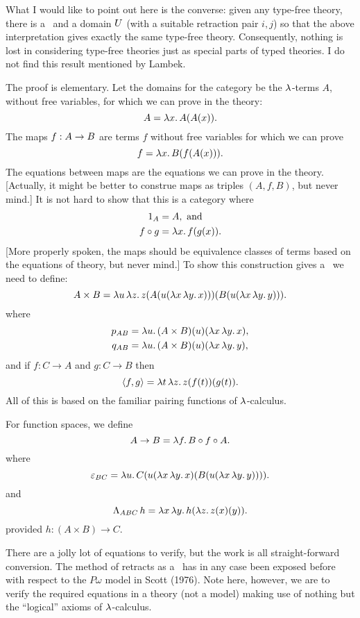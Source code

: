 What I would like to point out here is the converse: given any type-free theory, there is a \ccc\ and a domain $U$ (with a suitable retraction pair $i,j$) so that the above interpretation gives exactly the same type-free theory. Consequently, nothing is lost in considering type-free theories just as special parts of typed theories. I do not find this result mentioned by Lambek.

The proof is elementary. Let the domains for the category be the $\lambda$-terms $A$, without free variables, for which we can prove in the theory:
$$
A = \lm{x}. A(A(x)).
$$
The maps $f: A \rightarrow B$ are terms $f$ without free variables for which we can prove
$$
f = \lm{x}. B(f(A(x))).
$$
The equations between maps are the equations we can prove in the theory. [Actually, it might be better to construe maps as triples $(A,f,B)$, but never mind.] It is not hard to show that this is a category where
\begin{align*}
\id_A &= A, {\textrm{ and}}\\
f \comp g &= \lm{x}. f(g(x)).
\end{align*}
[More properly spoken, the maps should be equivalence classes of terms based on the equations of theory, but never mind.]
To show this construction gives a \ccc\ we need to define:
$$
A \times B = \lmm{u}{z}.z(A(u(\lxy x))) (B(u(\lxy y))).
$$
where
\begin{align*}
p_{AB} &= \lm{u}. (A \times B)(u)(\lxy x),\\
q_{AB} &= \lm{u}. (A \times B)(u)(\lxy y),
\end{align*}
%
and if $f:C\to A$ and $g: C\to B$ then
$$
\langle f,g \rangle = \lmm{t}{z}.z(f(t))(g(t)).
$$
All of this is based on the familiar pairing functions of $\lambda$-calculus.

For function spaces, we define
$$
\AB = \lm{f}. B \comp f \comp A.
$$
where
$$
\ebc = \lm{u}. C(u(\lxy x)(B(u(\lxy y)))).
$$
and
$$
\L_{ABC}\, h = \lxy h(\lm{z}. z(x)(y)).
$$
provided $h: (A \times B) \to C$.

There are a jolly lot of equations to verify, but the work is all straight-forward conversion. The method of retracts as a \ccc\ has in any case been exposed before with respect to the $P\omega$ model in Scott (1976). Note here, however, we are to verify the required equations in a theory (not a model) making use of nothing but the ``logical'' axioms of $\lambda$-calculus.

